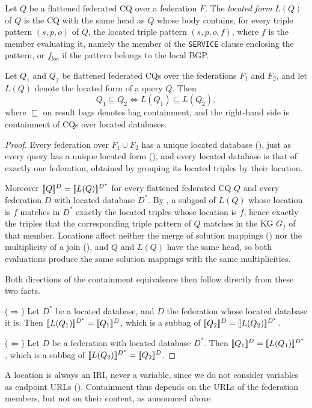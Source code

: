 \begin{definition}\label{def_located_form}
  Let $Q$ be a flattened federated \ac{CQ} over a federation $F$.
  The \emph{located form} $L(Q)$ of $Q$ is the \ac{CQ} with the same head as $Q$ whose body contains, for every triple pattern $(s,p,o)$ of $Q$, the located triple pattern $(s,p,o,f)$, where $f$ is the member evaluating it, namely the member of the \texttt{SERVICE} clause enclosing the pattern, or $f_{\mathit{loc}}$ if the pattern belongs to the local \ac{BGP}.
\end{definition}

\begin{proposition}\label{prop_federated_containment}
Let $Q_1$ and $Q_2$ be flattened federated \acp{CQ} over the federations $F_1$ and $F_2$, and let $L(Q)$ denote the located form of a query $Q$.
Then
\[
Q_1 \sqsubseteq Q_2 \iff L(Q_1) \sqsubseteq L(Q_2),
\]
where $\sqsubseteq$ on result bags denotes bag containment, and the right-hand side is containment of \acp{CQ} over located databases.
\end{proposition}

\begin{proof}
Every federation over $F_1 \cup F_2$ has a unique located database (), just as every query has a unique located form (), and every located database is that of exactly one federation, obtained by grouping its located triples by their location.

Moreover $\llbracket Q \rrbracket^{D} = \llbracket L(Q) \rrbracket^{D^{*}}$ for every flattened federated \ac{CQ} $Q$ and every federation $D$ with located database $D^{*}$.
By , a subgoal of $L(Q)$ whose location is $f$ matches in $D^{*}$ exactly the located triples whose location is $f$, hence exactly the triples that the corresponding triple pattern of $Q$ matches in the \ac{KG} $G_f$ of that member.
Locations affect neither the merge of solution mappings () nor the multiplicity of a join (), and $Q$ and $L(Q)$ have the same head, so both evaluations produce the same solution mappings with the same multiplicities.

Both directions of the containment equivalence then follow directly from these two facts.

($\Rightarrow$) Let $D^{*}$ be a located database, and $D$ the federation whose located database it is.
Then $\llbracket L(Q_1) \rrbracket^{D^{*}} = \llbracket Q_1 \rrbracket^{D}$, which is a subbag of $\llbracket Q_2 \rrbracket^{D} = \llbracket L(Q_2) \rrbracket^{D^{*}}$.

($\Leftarrow$) Let $D$ be a federation with located database $D^{*}$.
Then $\llbracket Q_1 \rrbracket^{D} = \llbracket L(Q_1) \rrbracket^{D^{*}}$, which is a subbag of $\llbracket L(Q_2) \rrbracket^{D^{*}} = \llbracket Q_2 \rrbracket^{D}$.
\end{proof}

A location is always an \ac{IRI}, never a variable, since we do not consider variables as endpoint URLs ().
Containment thus depends on the URLs of the federation members, but not on their content, as announced above.


